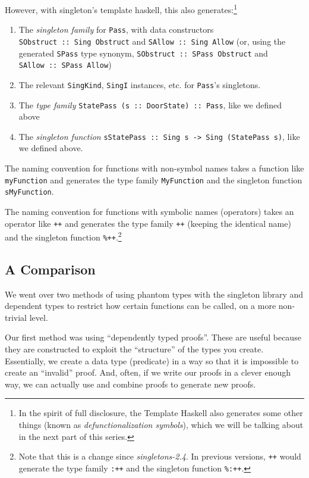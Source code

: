 \documentclass[]{article}
\begin{document}
However, with singleton's template haskell, this also generates:\footnote{In the
  spirit of full disclosure, the Template Haskell also generates some other
  things (known as \emph{defunctionalization symbols}), which we will be talking
  about in the next part of this series.}

\begin{enumerate}
\def\labelenumi{\arabic{enumi}.}
\tightlist
\item
  The \emph{singleton family} for \texttt{Pass}, with data constructors
  \texttt{SObstruct\ ::\ Sing\ \textquotesingle{}Obstruct} and
  \texttt{SAllow\ ::\ Sing\ \textquotesingle{}Allow} (or, using the generated
  \texttt{SPass} type synonym,
  \texttt{SObstruct\ ::\ SPass\ \textquotesingle{}Obstruct} and
  \texttt{SAllow\ ::\ SPass\ \textquotesingle{}Allow})
\item
  The relevant \texttt{SingKind}, \texttt{SingI} instances, etc. for
  \texttt{Pass}'s singletons.
\item
  The \emph{type family} \texttt{StatePass\ (s\ ::\ DoorState)\ ::\ Pass}, like
  we defined above
\item
  The \emph{singleton function}
  \texttt{sStatePass\ ::\ Sing\ s\ -\textgreater{}\ Sing\ (StatePass\ s)}, like
  we defined above.
\end{enumerate}

The naming convention for functions with non-symbol names takes a function like
\texttt{myFunction} and generates the type family \texttt{MyFunction} and the
singleton function \texttt{sMyFunction}.

The naming convention for functions with symbolic names (operators) takes an
operator like \texttt{++} and generates the type family \texttt{++} (keeping the
identical name) and the singleton function \texttt{\%++}.\footnote{Note that
  this is a change since \emph{singletons-2.4}. In previous versions,
  \texttt{++} would generate the type family \texttt{:++} and the singleton
  function \texttt{\%:++}.}

\hypertarget{a-comparison}{%
\subsection{A Comparison}\label{a-comparison}}

We went over two methods of using phantom types with the singleton library and
dependent types to restrict how certain functions can be called, on a more
non-trivial level.

Our first method was using ``dependently typed proofs''. These are useful
because they are constructed to exploit the ``structure'' of the types you
create. Essentially, we create a data type (predicate) in a way so that it is
impossible to create an ``invalid'' proof. And, often, if we write our proofs in
a clever enough way, we can actually use and combine proofs to generate new
proofs.
\end{document}
